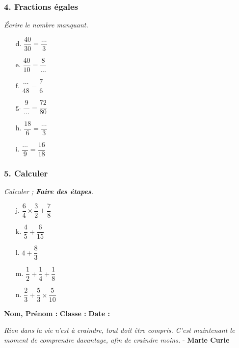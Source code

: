 \subsubsection*{4. Fractions égales}
\textit{Écrire le nombre manquant.}

\begin{multicols}{3}
\begin{enumerate}
  \item[d.] $\dfrac{40}{30} = \dfrac{\ldots}{3}$
  \item[e.] $\dfrac{40}{10} = \dfrac{8}{\ldots}$
  \item[f.] $\dfrac{\ldots}{48} = \dfrac{7}{6}$
  \item[g.] $\dfrac{9}{\ldots} = \dfrac{72}{80}$
  \item[h.] $\dfrac{18}{6} = \dfrac{\ldots}{3}$
  \item[i.] $\dfrac{\ldots}{9} = \dfrac{16}{18}$ 
\end{enumerate}
\end{multicols}

\newpage
\subsubsection*{5. Calculer}
\textit{Calculer ; \textbf{Faire des étapes}.}

\begin{multicols}{5}
\begin{enumerate}
  \item[j.] $\dfrac{6}{4} \times \dfrac{3}{2} + \dfrac{7}{8}$
  \item[k.] $\dfrac{4}{5} + \dfrac{6}{15}$
  \item[l.] $4 + \dfrac{8}{3}$
  \item[m.] $\dfrac{1}{2} + \dfrac{1}{4} + \dfrac{1}{8}$
  \item[n.] $\dfrac{2}{3} + \dfrac{5}{3} \times \dfrac{5}{10}$
\end{enumerate}
\end{multicols}

\Pointilles[48]

\newpage


\textbf{Nom, Prénom :} \hspace{8cm} \textbf{Classe :} \hspace{3cm} \textbf{Date :}\\

\begin{center}
  \textit{Rien dans la vie n'est à craindre, tout doit être compris. C'est maintenant le moment de comprendre davantage, afin de craindre moins.}  - \textbf{Marie Curie}
\end{center}

